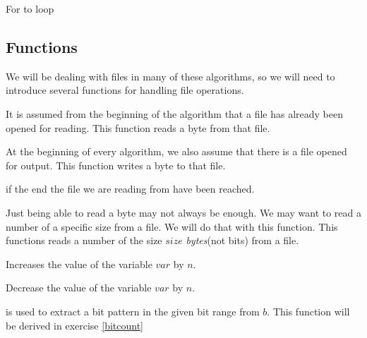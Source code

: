 \begin{algorithm}
  \caption{For to loop}\algohack{}
  \label{alg:forto}
  \begin{algorithmic}[1]
    \EndFor
  \end{algorithmic}
\end{algorithm}

\subsection{Functions}
\label{sec:pseudocode}

We will be dealing with files in many of these algorithms, so we will need
to introduce several functions for handling file operations.

\begin{description}[font=\normalfont]
\item[\textproc{ReadByte}] It is assumed from the beginning of the
  algorithm that a file has already been opened for reading. This
  function reads a byte from that file.

\item[\Call{WriteByte}{$\var{byte}$}] At the beginning of every algorithm,
  we also assume that there is a file opened for output. This function
  writes a byte to that file.

\item[\textproc{EndOfFileReached}] \True{} if the end the file we are
  reading from have been reached.

\item[\Call{Read}{$\var{size}$}] Just being able to read a byte may not
  always be enough. We may want to read a number of a specific size
  from a file. We will do that with this function. This functions
  reads a number of the size $size$ \textit{bytes}(not bits) from a
  file.

\item[\Call{Inc}{\ensuremath{\var{var},n}}] Increases the value of the
  variable $var$ by $n$.

\item[\Call{Dec}{\ensuremath{\var{var},n}}] Decrease the value of the
  variable $var$ by $n$.

\item[\Call{getbits}{$b, \var{start}, \var{end}$}] is used to extract a bit
  pattern in the given bit range from $b$. This function will be
  derived in exercise \ref{bitcount}

\end{description}

